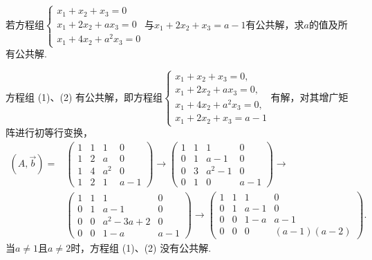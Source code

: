 \begin{exercise}
\begin{exgroup}
        \item 若方程组$\begin{cases}
                x_1+x_2+x_3=0   \\
                x_1+2x_2+ax_3=0 \\
                x_1+4x_2+a^2x_3=0
            \end{cases}$与$x_1+2x_2+x_3=a-1$有公共解，求$a$的值及所有公共解.
        \begin{answer}
            方程组 (1)、(2) 有公共解，即方程组$\begin{cases}
                x_1+x_2+x_3=0,     \\
                x_1+2x_2+ax_3=0,   \\
                x_1+4x_2+a^2x_3=0, \\
                x_1+2x_2+x_3=a-1
            \end{cases}$有解，对其增广矩阵进行初等行变换，
        \begin{align*}
            (A,\vec{b})= & \begin{pmatrix}
                           1 & 1 & 1   & 0   \\
                           1 & 2 & a   & 0   \\
                           1 & 4 & a^2 & 0   \\
                           1 & 2 & 1   & a-1
                       \end{pmatrix}\rightarrow
            \begin{pmatrix}
                1 & 1 & 1     & 0   \\
                0 & 1 & a-1   & 0   \\
                0 & 3 & a^2-1 & 0   \\
                0 & 1 & 0     & a-1
            \end{pmatrix}\rightarrow            \\
                     & \begin{pmatrix}
                           1 & 1 & 1        & 0   \\
                           0 & 1 & a-1      & 0   \\
                           0 & 0 & a^2-3a+2 & 0   \\
                           0 & 0 & 1-a      & a-1
                       \end{pmatrix}\rightarrow
            \begin{pmatrix}
                1 & 1 & 1   & 0          \\
                0 & 1 & a-1 & 0          \\
                0 & 0 & 1-a & a-1        \\
                0 & 0 & 0   & (a-1)(a-2)
            \end{pmatrix}.
        \end{align*}
        当$a\neq 1$且$a\neq 2$时，方程组 (1)、(2) 没有公共解.


\end{answer}
\end{exgroup}
\end{exercise}
